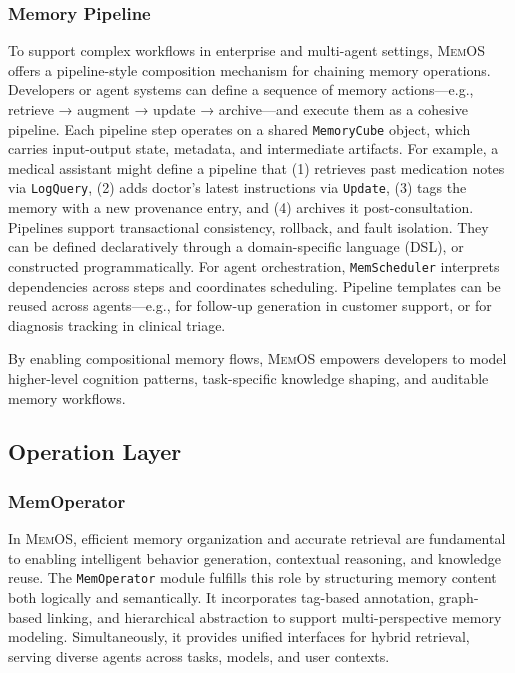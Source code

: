 \documentclass[]{memtensor}
\begin{document}
\subsubsection{Memory Pipeline}
To support complex workflows in enterprise and multi-agent settings, \textsc{MemOS} offers a pipeline-style composition mechanism for chaining memory operations. Developers or agent systems can define a sequence of memory actions—e.g., retrieve → augment → update → archive—and execute them as a cohesive pipeline.
Each pipeline step operates on a shared \texttt{MemoryCube} object, which carries input-output state, metadata, and intermediate artifacts. For example, a medical assistant might define a pipeline that (1) retrieves past medication notes via \texttt{LogQuery}, (2) adds doctor’s latest instructions via \texttt{Update}, (3) tags the memory with a new provenance entry, and (4) archives it post-consultation.
Pipelines support transactional consistency, rollback, and fault isolation. They can be defined declaratively through a domain-specific language (DSL), or constructed programmatically. For agent orchestration, \texttt{MemScheduler} interprets dependencies across steps and coordinates scheduling. Pipeline templates can be reused across agents—e.g., for follow-up generation in customer support, or for diagnosis tracking in clinical triage.

By enabling compositional memory flows, \textsc{MemOS} empowers developers to model higher-level cognition patterns, task-specific knowledge shaping, and auditable memory workflows.

\subsection{Operation Layer}
\subsubsection{MemOperator}

In \textsc{MemOS}, efficient memory organization and accurate retrieval are fundamental to enabling intelligent behavior generation, contextual reasoning, and knowledge reuse. The \texttt{MemOperator} module fulfills this role by structuring memory content both logically and semantically. It incorporates tag-based annotation, graph-based linking, and hierarchical abstraction to support multi-perspective memory modeling. Simultaneously, it provides unified interfaces for hybrid retrieval, serving diverse agents across tasks, models, and user contexts.
\end{document}
